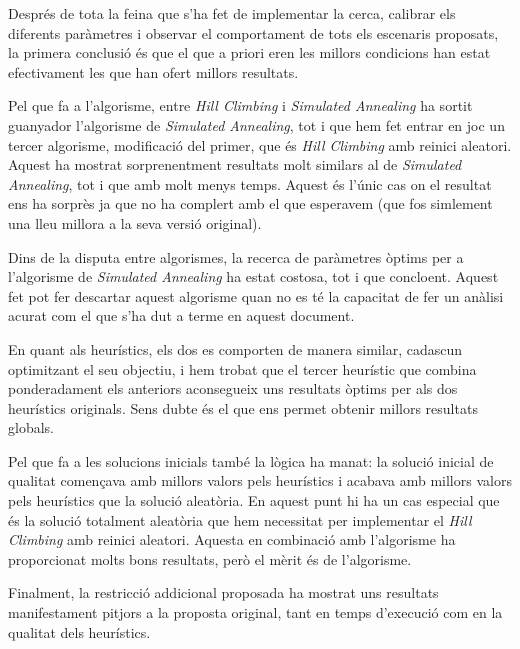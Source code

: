 
Després de tota la feina que s'ha fet de implementar la cerca, calibrar els diferents paràmetres i observar el comportament de tots els escenaris proposats, la primera conclusió és que el que a priori eren les millors condicions han estat efectivament les que han ofert millors resultats.

Pel que fa a l'algorisme, entre \emph{Hill Climbing} i \emph{Simulated Annealing} ha sortit guanyador l'algorisme de \emph{Simulated Annealing}, tot i que hem fet entrar en joc un tercer algorisme, modificació del primer, que és \emph{Hill Climbing} amb reinici aleatori. Aquest ha mostrat sorprenentment resultats molt similars al de \emph{Simulated Annealing}, tot i que amb molt menys temps. Aquest és l'únic cas on el resultat ens ha sorprès ja que no ha complert amb el que esperavem (que fos simlement una lleu millora a la seva versió original).

Dins de la disputa entre algorismes, la recerca de paràmetres òptims per a l'algorisme de \emph{Simulated Annealing} ha estat costosa, tot i que concloent. Aquest fet pot fer descartar aquest algorisme quan no es té la capacitat de fer un anàlisi acurat com el que s'ha dut a terme en aquest document.

En quant als heurístics, els dos es comporten de manera similar, cadascun optimitzant el seu objectiu, i hem trobat que el tercer heurístic que combina ponderadament els anteriors aconsegueix uns resultats òptims per als dos heurístics originals. Sens dubte és el que ens permet obtenir millors resultats globals.

Pel que fa a les solucions inicials també la lògica ha manat: la solució inicial de qualitat començava amb millors valors pels heurístics i acabava amb millors valors pels heurístics que la solució aleatòria. En aquest punt hi ha un cas especial que és la solució totalment aleatòria que hem necessitat per implementar el \emph{Hill Climbing} amb reinici aleatori. Aquesta en combinació amb l'algorisme ha proporcionat molts bons resultats, però el mèrit és de l'algorisme.

Finalment, la restricció addicional proposada ha mostrat uns resultats manifestament pitjors a la proposta original, tant en temps d'execució com en la qualitat dels heurístics.
